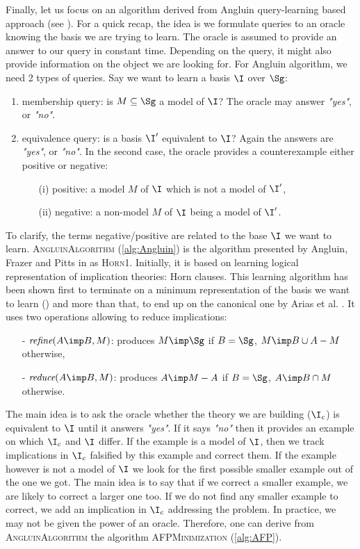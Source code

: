 \documentclass[a4paper, 10pt]{article}
\begin{document}
Finally, let us focus on an algorithm derived from Angluin query-learning based approach (see \cite{angluin_learning_1992, arias_canonical_2009}). For a quick recap,  the idea is we formulate queries to an oracle knowing the basis we are trying to learn. The oracle is assumed to provide an answer to our query in constant time. Depending on the query, it might also provide information on the object we are looking for. For Angluin algorithm, we need 2 types of queries. Say we want to learn a basis $\I$ over $\Sg$:
\begin{enumerate}
	\item membership query: is $M \subseteq \Sg$ a model of $\I$? The
	oracle may answer \textit{"yes"}, or \textit{"no"}.
	\item equivalence query: is a basis $\I'$ equivalent to $\I$? Again
	the answers are \textit{"yes"}, or \textit{"no"}. In the second case, the oracle provides a counterexample either positive or negative:
	\begin{itemize}
		\item[(i)] positive: a model $M$ of $\I$ which is not a
		model of $\I'$,
		\item[(ii)] negative: a non-model $M$ of $\I$ being a model
		of $\I'$. 
	\end{itemize}
\end{enumerate}
\noindent To clarify, the terms negative/positive are related to the base $\I$
we want to learn. \textsc{AngluinAlgorithm} (\ref{alg:Angluin}) is the algorithm presented by Angluin, Frazer and Pitts in \cite{angluin_learning_1992} as \textsc{Horn1}. 
Initially, it is based on learning logical representation of implication theories: Horn clauses. This learning algorithm has been shown first to terminate on a minimum representation of the basis we want to learn (\cite{angluin_learning_1992}) and more than that, to end up on the canonical
one by Arias et al. \cite{arias_canonical_2009}. It uses two operations allowing to reduce implications:
\begin{itemize}
	\item[-] $\textit{refine}(A \imp B, M)$: produces $M \imp \Sg$ if $B = \Sg$, $M \imp B \cup A - M$ otherwise,
	\item[-] $\textit{reduce}(A \imp B, M)$: produces $A \imp M - A$ if $B = \Sg$, $A \imp B \cap M$ otherwise.
\end{itemize}
\noindent The main idea is to ask the oracle whether the theory we are building ($\I_c$) is equivalent to $\I$ until it answers \textit{"yes"}. If it says \textit{"no"} then it provides an example on which $\I_c$ and $\I$ differ. If
the example is a model of $\I$, then we track implications in $\I_c$ falsified
by this example and correct them. If the example however is not a model of $\I$
we look for the first possible smaller example out of the one we got. The main
idea is to say that if we correct a smaller example, we are likely to correct
a larger one too. If we do not find any smaller example to correct, we add 
an implication in $\I_c$ addressing the problem. In practice, we may not be given the power of an oracle. Therefore, one can derive from \textsc{AngluinAlgorithm} the algorithm \textsc{AFPMinimization} (\ref{alg:AFP}).
\end{document}

